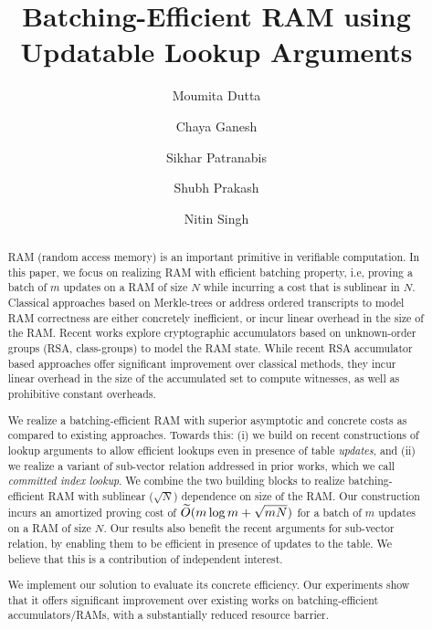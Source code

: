 \documentclass{llncs}
\title{Batching-Efficient RAM using Updatable Lookup Arguments}
\author{Moumita Dutta\inst{1} \and Chaya Ganesh\inst{1} \and Sikhar Patranabis\inst{2} \and Shubh Prakash\inst{1} \and Nitin Singh\inst{2}}
\institute{Indian Institute of Science\\
	\email{\{moumitadutta,chaya,shubhprakash\}@iisc.ac.in}
	\and
	IBM Research, India \\
	\email{sikharpatranabis@ibm.com,nitisin1@in.ibm.com}
}
\begin{document}
	
	\maketitle
	
	\begin{abstract}

		RAM (random access memory) is an important primitive in verifiable computation. In this paper, we focus on realizing RAM with efficient batching property, i.e,
		proving a batch of $m$ updates on a RAM of size $N$ while incurring a cost that is sublinear in $N$. Classical approaches based on Merkle-trees or address ordered transcripts to model RAM correctness are either concretely inefficient, or incur linear overhead in the size of the RAM. Recent works explore cryptographic accumulators based on unknown-order groups (RSA, class-groups) to model the RAM state. While recent RSA accumulator based approaches offer significant improvement over classical methods, they incur linear overhead in the size of the accumulated set to compute witnesses, as well as prohibitive constant overheads.
		
		\medskip
		
		We realize a batching-efficient RAM with superior asymptotic and concrete costs as compared to existing approaches. Towards this: (i) we build on recent constructions of lookup arguments to allow efficient lookups even in presence of table \textit{updates}, and (ii) we realize a variant of sub-vector relation addressed in prior works, which we call {\em committed index lookup}. We combine the two building blocks to realize batching-efficient RAM with sublinear ($\sqrt{N}$) dependence on size of the RAM. Our construction incurs an amortized proving cost of $\widetilde{O}(m\log m + \sqrt{mN})$ for a batch of $m$ updates on a RAM of size $N$. Our results also benefit the recent arguments for sub-vector relation, by enabling them to be efficient in presence of updates to the table. We believe that this is a contribution of independent interest. 
		
		\medskip

		We implement our solution to evaluate its concrete efficiency. Our experiments show that it offers significant improvement over existing works on batching-efficient accumulators/RAMs, with a substantially reduced resource barrier.


	\end{abstract}
	
	\thispagestyle{plain}
	
	\pagestyle{plain}
	
\end{document}
